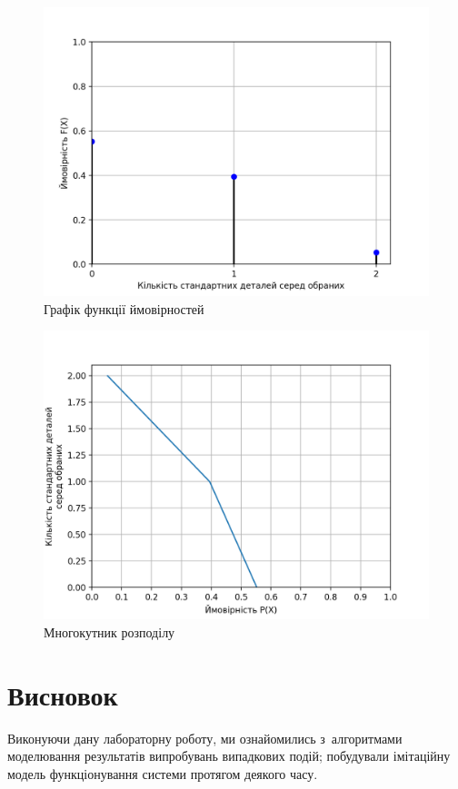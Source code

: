 \documentclass[
	a4paper,
	oneside,
	BCOR = 10mm,
	DIV = 12,
	12pt,
	headings = normal,
]{scrartcl}
\begin{document}
		\begin{figure}[!htbp]
			\centering
			\includegraphics[height = 14\baselineskip]{./assets/y03s02-imitmod-lab-03-p01.png}
			\caption{Графік функції ймовірностей}
			\label{fig:pmf}
		\end{figure}%

		\begin{figure}[!htbp]
			\centering
			\includegraphics[height = 14\baselineskip]{./assets/y03s02-imitmod-lab-03-p02.png}
			\caption{Многокутник розподілу}
			\label{fig:dist-polygon}
		\end{figure}

		\section{Висновок}
			Виконуючи дану лабораторну роботу, ми ознайомились з~алгоритмами моделювання результатів випробувань випадкових подій; побудували імітаційну модель функціонування системи протягом деякого часу.
\end{document}
